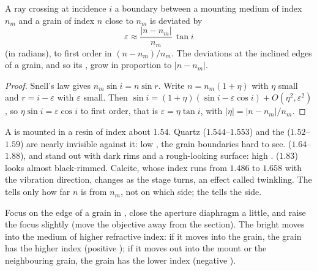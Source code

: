 \begin{proposition}\label{prop:b1:optical-mineralogy:relief}
A ray crossing at incidence $i$ a boundary between a mounting medium of index
$n_m$ and a grain of index $n$ close to $n_m$ is deviated by
\[
  \varepsilon \approx \frac{|n - n_m|}{n_m}\,\tan i
\]
(in radians), to first order in $(n - n_m)/n_m$. The deviations at the
inclined edges of a grain, and so its , grow in proportion to
$|n - n_m|$.
\end{proposition}

\begin{proof}
Snell's law gives $n_m \sin i = n \sin r$. Write $n = n_m(1 + \eta)$ with
$\eta$ small and $r = i - \varepsilon$ with $\varepsilon$ small. Then
$\sin i = (1 + \eta)(\sin i - \varepsilon\cos i) + O(\eta^2, \varepsilon^2)$,
so $\eta \sin i = \varepsilon\cos i$ to first order, that is
$\varepsilon = \eta\tan i$, with $|\eta| = |n - n_m|/n_m$.
\end{proof}

A  is mounted in a resin of index about $1.54$.
Quartz ($1.544$--$1.553$) and the  ($1.52$--$1.59$) are nearly
invisible against it: low , the grain boundaries hard to see. 
($1.64$--$1.88$),  and  stand out with dark rims and a
rough-looking surface: high .  ($1.83$) looks almost black-rimmed.
Calcite, whose index runs from $1.486$ to $1.658$ with the vibration
direction, changes  as the stage turns, an effect called twinkling.
The  tells only how far $n$ is from $n_m$, not on which side; the  tells the side.

\begin{method}\label{met:b1:optical-mineralogy:becke}
Focus on the edge of a grain in , close the aperture
diaphragm a little, and raise the focus slightly (move the objective away from
the section). The bright  moves into the medium of higher refractive
index: if it moves into the grain, the grain has the higher index (positive
); if it moves out into the mount or the neighbouring grain, the grain
has the lower index (negative ).
\end{method}

